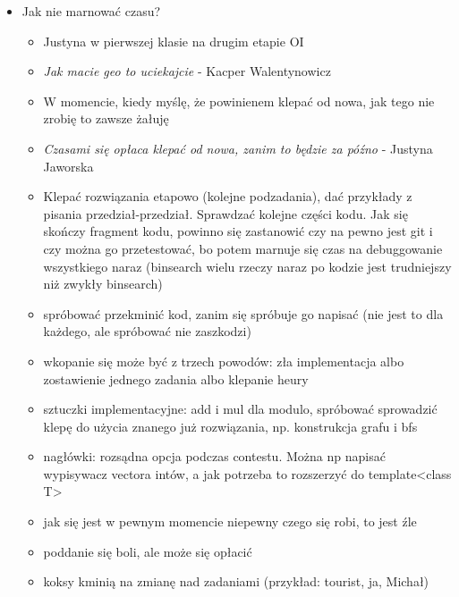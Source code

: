 \documentclass{article}
\begin{document}
\begin{itemize}
    \item Jak nie marnować czasu?
    \begin{itemize}
        \item Justyna w pierwszej klasie na drugim etapie OI
        \item \textit{Jak macie geo to uciekajcie} - Kacper Walentynowicz
        \item W momencie, kiedy myślę, że powinienem klepać od nowa, jak tego nie zrobię to zawsze żałuję
        \item \textit{Czasami się opłaca klepać od nowa, zanim to będzie za późno} - Justyna Jaworska
        \item Klepać rozwiązania etapowo (kolejne podzadania), dać przykłady z pisania przedział-przedział. Sprawdzać kolejne części kodu. Jak się skończy fragment kodu, powinno się zastanowić czy na pewno jest git i czy można go przetestować, bo potem marnuje się czas na debuggowanie wszystkiego naraz (binsearch wielu rzeczy naraz po kodzie jest trudniejszy niż zwykły binsearch)
        \item spróbować przekminić kod, zanim się spróbuje go napisać (nie jest to dla każdego, ale spróbować nie zaszkodzi)
        \item wkopanie się może być z trzech powodów: zła implementacja albo zostawienie jednego zadania albo klepanie heury
        \item sztuczki implementacyjne: add i mul dla modulo, spróbować sprowadzić klepę do użycia znanego już rozwiązania, np. konstrukcja grafu i bfs
        \item nagłówki: rozsądna opcja podczas contestu. Można np napisać wypisywacz vectora intów, a jak potrzeba to rozszerzyć do template<class T>
        \item jak się jest w pewnym momencie niepewny czego się robi, to jest źle
        \item poddanie się boli, ale może się opłacić
        \item koksy kminią na zmianę nad zadaniami (przykład: tourist, ja, Michał)
    \end{itemize}
    

\end{itemize}
\end{document}
